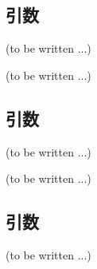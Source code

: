 \subsection{引数\TBW}
(to be written ...)



(to be written ...)


\subsection{引数\TBW}
(to be written ...)



(to be written ...)


\subsection{引数\TBW}
(to be written ...)




